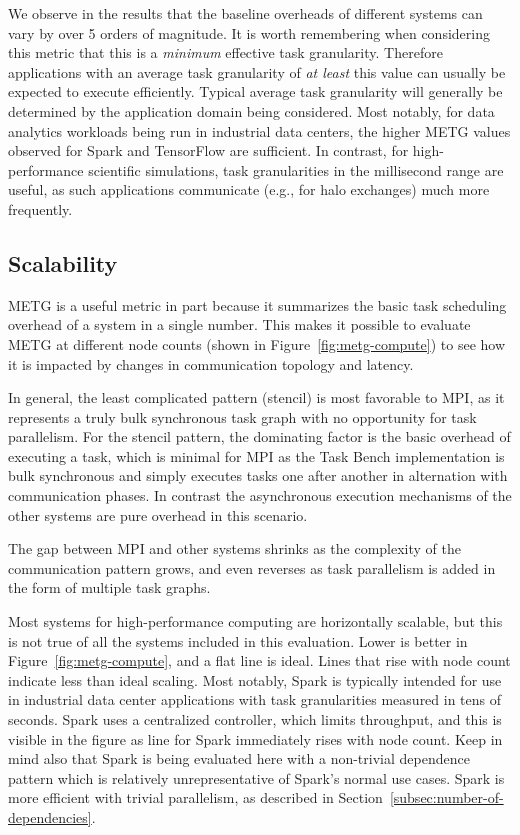 We observe in the results that the baseline overheads of different
systems can vary by over 5 orders of magnitude. It is worth
remembering when considering this metric that this is a \emph{minimum}
effective task granularity. Therefore applications with an average
task granularity of \emph{at least} this value can usually be expected
to execute efficiently. Typical average task granularity will
generally be determined by the application domain being
considered. Most notably, for data analytics workloads being run in
industrial data centers, the higher METG values observed for Spark and
TensorFlow are sufficient. In contrast, for high-performance
scientific simulations, task granularities in the millisecond range
are useful, as such applications communicate (e.g., for halo
exchanges) much more frequently.

\subsection{Scalability}
\label{subsec:scalability}

METG is a useful metric in part because it summarizes the basic task
scheduling overhead of a system in a single number. This makes it
possible to evaluate METG at different node counts (shown in
Figure~\ref{fig:metg-compute}) to see how it is impacted by changes in
communication topology and latency.

In general, the least complicated pattern (stencil) is most favorable
to MPI, as it represents a truly bulk synchronous task graph with no
opportunity for task parallelism. For the stencil pattern, the
dominating factor is the basic overhead of executing a task, which is
minimal for MPI as the Task Bench implementation is bulk synchronous
and simply executes tasks one after another in alternation with
communication phases. In contrast the asynchronous execution
mechanisms of the other systems are pure overhead in this scenario.

The gap between MPI and other systems shrinks as the complexity of the
communication pattern grows, and even reverses as task parallelism is
added in the form of multiple task graphs.


Most systems for high-performance computing are horizontally scalable,
but this is not true of all the systems included in this
evaluation. Lower is better in Figure~\ref{fig:metg-compute}, and a
flat line is ideal. Lines that rise with node count indicate less than
ideal scaling. Most notably, Spark is typically
intended for use in industrial data center applications with task
granularities measured in tens of seconds. Spark uses a centralized
controller, which limits throughput, and this is visible in the figure
as line for Spark immediately rises with node count. Keep in mind also
that Spark is being evaluated here with a non-trivial dependence
pattern which is relatively unrepresentative of Spark's normal use
cases. Spark is more efficient with trivial parallelism, as described
in Section~\ref{subsec:number-of-dependencies}.

